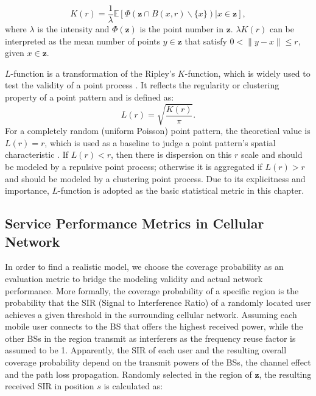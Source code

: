\begin{equation} \label{kfun}
K(r)=\frac{1}{\lambda}\mathbb{E}[\Phi(\mathbf{z} \cap B(x,r)\backslash \{ x\} )| x \in \mathbf{z}],
\end{equation}
where $\lambda$ is the intensity and $\Phi(\mathbf{z})$ is the point number in $\mathbf{z}$. $\lambda K(r)$ can be interpreted as the mean number of points $y\in\mathbf{z}$ that satisfy $0< \|y-x\|\le r$, given $x\in\mathbf{z}$.

$L$-function is a transformation of the Ripley's $K$-function, which is widely used to test the validity of a point process \cite{ripley1991statistical}. It reflects the regularity or clustering property of a point pattern and is defined as:
\begin{equation}
L(r)=\sqrt{\frac{K(r)}{\pi}}.
\end{equation}
For a completely random (uniform Poisson) point pattern, the theoretical value is $L(r)=r$, which is used as a baseline to judge a point pattern's spatial characteristic \cite{ripley1991statistical}. If $L(r)<r$, then there is dispersion on this $r$ scale and should be modeled by a repulsive point process; otherwise it is aggregated if $L(r)>r$ and should be modeled by a clustering point process. Due to its explicitness and importance, $L$-function is adopted as the basic statistical metric in this chapter.
\subsection*{Service Performance Metrics in Cellular Network}
In order to find a realistic model, we choose the coverage probability as an evaluation metric to bridge the modeling validity and actual network performance. More formally, the coverage probability of a specific region is the probability that the SIR (Signal to Interference Ratio) of a randomly located user achieves a given threshold in the surrounding cellular network. Assuming each mobile user connects to the BS that offers the highest received power, while the other BSs in the region transmit as interferers as the frequency reuse factor is assumed to be 1. Apparently, the SIR of each user and the resulting overall coverage probability depend on the transmit powers of the BSs, the channel effect and the path loss propagation. Randomly selected in the region of $\mathbf{z}$, the resulting received SIR in position $s$ is calculated as:

